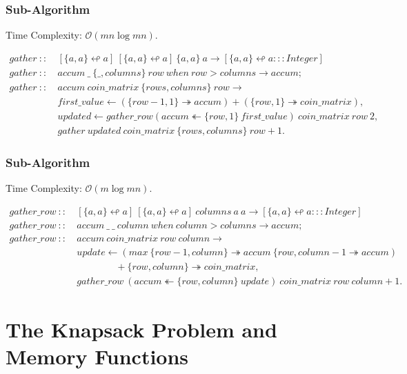 \documentclass[a4paper,10pt]{book}
\newcommand\when{\  when\ }
\begin{document}
\subsubsection{Sub-Algorithm}

Time Complexity: $\mathcal{O}(mn\log mn)$.

\begin{align*}
gather\ ::\ &[\{a,a\}\looparrowleft a]\ [\{a,a\}\looparrowleft a]\ \{a,a\}\ a\rightarrow [\{a,a\}\looparrowleft a:::Integer]\\
gather\ ::\ &accum\ \_\ \{\_,columns\}\ row\when row > columns\rightarrow accum;\\
gather\ ::\ &accum\ coin\_matrix\ \{rows,columns\}\ row\rightarrow\\
	&first\_value\leftarrow (\{row-1,1\}\twoheadrightarrow accum)+(\{row,1\}\twoheadrightarrow coin\_matrix),\\
	&updated\leftarrow gather\_row (accum\twoheadleftarrow \{row,1\}\ first\_value)\ coin\_matrix\ row\ 2,\\
	&gather\ updated\ coin\_matrix\ \{rows,columns\}\ row+1.
\end{align*}

\subsubsection{Sub-Algorithm}

Time Complexity: $\mathcal{O}(m\log mn)$.

\begin{align*}
gather\_row\ ::\ &[\{a,a\}\looparrowleft a]\ [\{a,a\}\looparrowleft a]\ columns\ a\ a\rightarrow [\{a,a\}\looparrowleft a:::Integer]\\
gather\_row\ ::\ &accum\ \_\ \_\ column\when column>columns\rightarrow accum;\\
gather\_row\ ::\ &accum\ coin\_matrix\ row\ column\rightarrow\\
	&update\leftarrow (max\ \{row-1,column\}\twoheadrightarrow accum\ \{row,column-1\twoheadrightarrow accum)\\
	&\qquad\qquad+\{row,column\}\twoheadrightarrow coin\_matrix,\\
	&gather\_row\ (accum\twoheadleftarrow \{row,column\}\ update)\ coin\_matrix\ row\ column+1.
\end{align*}

\section{The Knapsack Problem and Memory Functions}
\end{document}
